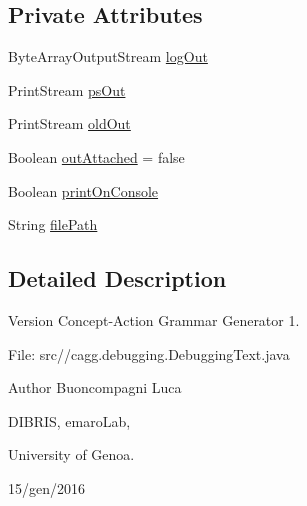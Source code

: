 \subsection*{Private Attributes}
\begin{DoxyCompactItemize}
\item 
Byte\-Array\-Output\-Stream \hyperlink{classit_1_1emarolab_1_1cagg_1_1debugging_1_1StandaloneDebuggingText_1_1ConsoleLogRidirector_a75347ea0b58cd07915d8c35268bea7ea}{log\-Out}
\item 
Print\-Stream \hyperlink{classit_1_1emarolab_1_1cagg_1_1debugging_1_1StandaloneDebuggingText_1_1ConsoleLogRidirector_a9e30942ca14484e287625036d6700b21}{ps\-Out}
\item 
Print\-Stream \hyperlink{classit_1_1emarolab_1_1cagg_1_1debugging_1_1StandaloneDebuggingText_1_1ConsoleLogRidirector_ab1648f30e5481166e5b6d80b4c73f5dd}{old\-Out}
\item 
Boolean \hyperlink{classit_1_1emarolab_1_1cagg_1_1debugging_1_1StandaloneDebuggingText_1_1ConsoleLogRidirector_a61365831ad47d960c5679b369b83e52f}{out\-Attached} = false
\item 
Boolean \hyperlink{classit_1_1emarolab_1_1cagg_1_1debugging_1_1StandaloneDebuggingText_1_1ConsoleLogRidirector_ac20283258cc8819bfb23d5ae5aed23f9}{print\-On\-Console}
\item 
String \hyperlink{classit_1_1emarolab_1_1cagg_1_1debugging_1_1StandaloneDebuggingText_1_1ConsoleLogRidirector_a870d183ab1015b37ba316062225c5ea5}{file\-Path}
\end{DoxyCompactItemize}


\subsection{Detailed Description}
\begin{DoxyVersion}{Version}
Concept-\/\-Action Grammar Generator 1. \par
 File\-: src//cagg.debugging.\-Debugging\-Text.\-java \par

\end{DoxyVersion}
\begin{DoxyAuthor}{Author}
Buoncompagni Luca \par
 D\-I\-B\-R\-I\-S, emaro\-Lab,\par
 University of Genoa. \par
 15/gen/2016 \par

\end{DoxyAuthor}



